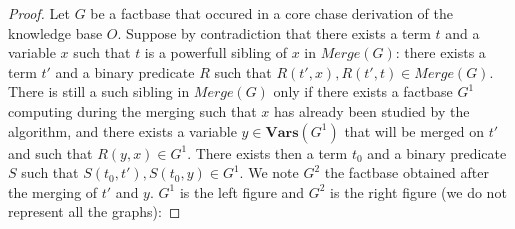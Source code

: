 \documentclass{article}
\theoremstyle{definition}
\theoremstyle{remark}
\newcommand{\Vars}{\textbf{Vars}}
\newcommand{\Merge}{\textit{Merge}}
\begin{document}
\begin{proof}
Let $G$ be a factbase that occured in a core chase derivation of the knowledge base $O$. 
Suppose by contradiction that there exists a term $t$ and a variable $x$ such that $t$ is a powerfull sibling of $x$ in $\Merge(G)$: there exists a term $t'$ and a binary predicate $R$ such that $R(t',x),R(t',t) \in \Merge(G)$. There is still a such sibling in $\Merge(G)$ only if there exists a factbase $G^1$ computing during the merging such that $x$ has already been studied by the algorithm, and there exists a variable $y \in \Vars(G^1)$ that will be merged on $t'$ and such that $R(y,x) \in G^1$. There exists then a term $t_0$ and a binary predicate $S$ such that $S(t_0,t'),S(t_0,y) \in G^1$. We note $G^2$ the factbase obtained after the merging of $t'$ and $y$. $G^1$ is the left figure and $G^2$ is the right figure (we do not represent all the graphs):


\end{proof}
\end{document}
